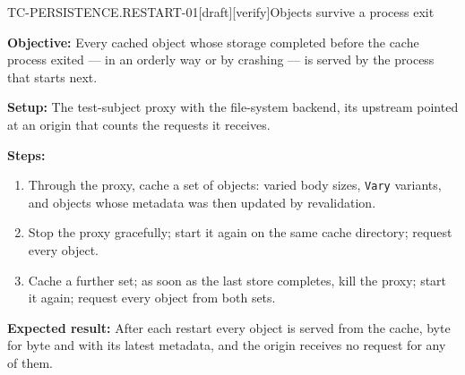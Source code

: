\begin{requirement}{TC-PERSISTENCE.RESTART-01}[draft][verify]{Objects survive a process exit}


  \textbf{Objective:} Every cached object whose storage completed before the
  cache process exited --- in an orderly way or by crashing --- is served by
  the process that starts next.

  \textbf{Setup:} The test-subject proxy with the file-system backend, its
  upstream pointed at an origin that counts the requests it receives.

  \textbf{Steps:}
  \begin{enumerate}
    \item Through the proxy, cache a set of objects: varied body sizes,
      \texttt{Vary} variants, and objects whose metadata was then updated by
      revalidation.
    \item Stop the proxy gracefully; start it again on the same cache
      directory; request every object.
    \item Cache a further set; as soon as the last store completes, kill the
      proxy; start it again; request every object from both sets.
  \end{enumerate}

  \textbf{Expected result:} After each restart every object is served from the
  cache, byte for byte and with its latest metadata, and the origin receives
  no request for any of them.



\end{requirement}

